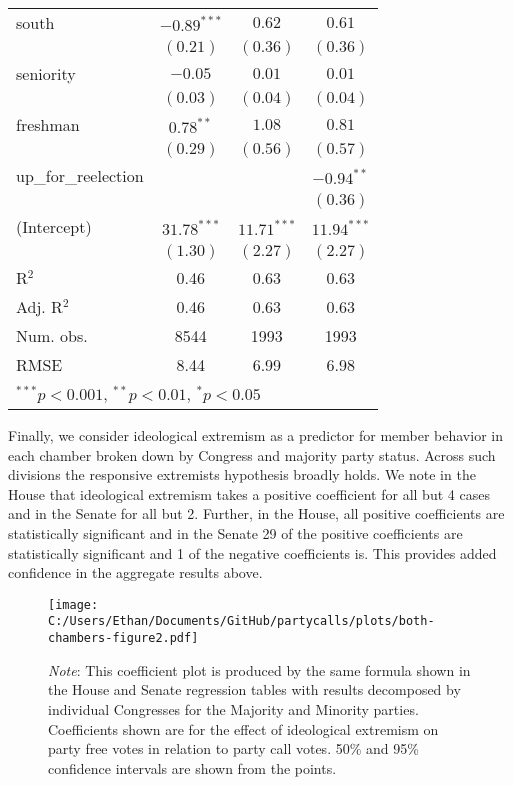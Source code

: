 \documentclass[12pt]{article}
\newcommand\fnote[1]{\captionsetup{font=small}\caption*{#1}}
\begin{document}
\begin{table}
\begin{center}
\begin{tabular}{l c c c }
			south                  & $-0.89^{***}$ & $0.62$        & $0.61$        \\
			& $(0.21)$      & $(0.36)$      & $(0.36)$      \\
			seniority              & $-0.05$       & $0.01$        & $0.01$        \\
			& $(0.03)$      & $(0.04)$      & $(0.04)$      \\
			freshman               & $0.78^{**}$   & $1.08$        & $0.81$        \\
			& $(0.29)$      & $(0.56)$      & $(0.57)$      \\
			up\_for\_reelection    &               &               & $-0.94^{**}$  \\
			&               &               & $(0.36)$      \\
			(Intercept)            & $31.78^{***}$ & $11.71^{***}$ & $11.94^{***}$ \\
			& $(1.30)$      & $(2.27)$      & $(2.27)$      \\
			\hline
			R$^2$                  & 0.46          & 0.63          & 0.63          \\
			Adj. R$^2$             & 0.46          & 0.63          & 0.63          \\
			Num. obs.              & 8544          & 1993          & 1993          \\
			RMSE                   & 8.44          & 6.99          & 6.98          \\
			\hline
			\multicolumn{4}{l}{\scriptsize{$^{***}p<0.001$, $^{**}p<0.01$, $^*p<0.05$}}
		\end{tabular}
	\fnote{\textit{}}
	\end{center}
\end{table}

Finally, we consider ideological extremism as a predictor for member behavior in each chamber broken down by Congress and majority party status. Across such divisions the responsive extremists hypothesis broadly holds. We note in the House that ideological extremism takes a positive coefficient for all but 4 cases and in the Senate for all but 2. Further, in the House, all positive coefficients are statistically significant and in the Senate 29 of the positive coefficients are statistically significant and 1 of the negative coefficients is. This provides added confidence in the aggregate results above.

\begin{figure}[H]
	\centering
	\caption{Ideology and Responsiveness to Party Calls, Congresses 93-112}
	\texttt{[image: C:/Users/Ethan/Documents/GitHub/partycalls/plots/both-chambers-figure2.pdf]}
	\fnote{\textit{Note}: This coefficient plot is produced by the same formula shown in the House and Senate regression tables with results decomposed by individual Congresses for the Majority and Minority parties. Coefficients shown are for the effect of ideological extremism on party free votes in relation to party call votes. 50\% and 95\% confidence intervals are shown from the points.}
\end{figure} 
\end{document}
